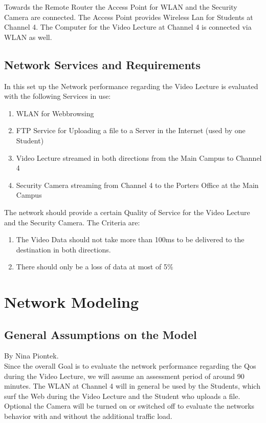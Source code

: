 \documentclass[a4paper,10pt]{book}\usepackage{graphicx}
\begin{document}
Towards the Remote Router the Access Point for WLAN and the Security Camera are connected.
The Access Point provides Wireless Lan for Students at Channel 4. The Computer for the Video Lecture at Channel 4 
is connected via WLAN as well.



\section{Network Services and Requirements}

In this set up the Network performance regarding the Video Lecture is evaluated with the following Services in
use:\\
\begin{enumerate}
 \item WLAN for Webbrowsing
 \item FTP Service for Uploading a file to a Server in the Internet (used by one Student) 
 \item Video Lecture streamed in both directions from the Main Campus to Channel 4
 \item Security Camera streaming from Channel 4 to the Porters Office  at the Main Campus
\end{enumerate}

The network should provide a certain Quality of Service for the Video Lecture and the Security Camera.
The Criteria are:\\
\begin{enumerate}
 \item The Video Data should not take more than 100ms to be delivered to the destination in both directions.
 \item There should only be a loss of data at most of 5$ \% $
\end{enumerate}

\chapter{Network Modeling}
\section{General Assumptions on the Model}
By Nina Piontek.\\

Since the overall Goal is to evaluate the network performance regarding the Qos during the Video Lecture, we will assume an assessment period
of around 90 minutes. The WLAN at Channel 4 will in general be used by the Students, which surf the Web during the Video Lecture and the Student 
who uploads a file. Optional the Camera will be turned on or switched off to evaluate the networks behavior with and without the additional
traffic load.
\end{document}
